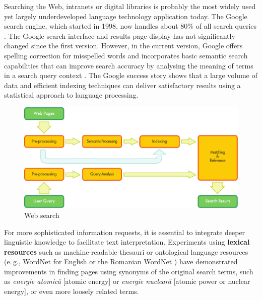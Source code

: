 \documentclass[]{../../metanetpaper}
\begin{document}
\begin{multicols}{2}
Searching the Web, intranets or digital libraries is probably the most widely used yet largely underdeveloped language technology application today. The Google search engine, which started in 1998, now handles about 80\% of all search queries \cite{spi1}. The Google search interface and results page display has not significantly changed since the first version. However, in the current version, Google offers spelling correction for misspelled words and incorporates basic semantic search capabilities that can improve search accuracy by analysing the meaning of terms in a search query context \cite{pc1}. The Google success story shows that a large volume of data and efficient indexing techniques can deliver satisfactory results using a statistical approach to language processing. 

\begin{figure}[htb]
  \center
  \includegraphics[width=\textwidth]{../_media/english/web_search_architecture}
  \caption{Web search}
  \label{fig:websearcharch_en}
 \end{figure}

For more sophisticated information requests, it is essential to integrate deeper linguistic knowledge to facilitate text interpretation. Experiments using \textbf{lexical resources} such as machine-readable thesauri or ontological language resources (e.\,g., WordNet for English or the Romanian WordNet \cite{WN}) have demonstrated improvements in finding pages using synonyms of the original search terms, such as \textit{energie atomică} {[}atomic energy{]} or \textit{energie nucleară} {[}atomic power or nuclear energy{]}, or even more loosely related terms.



\end{multicols}
\end{document}
